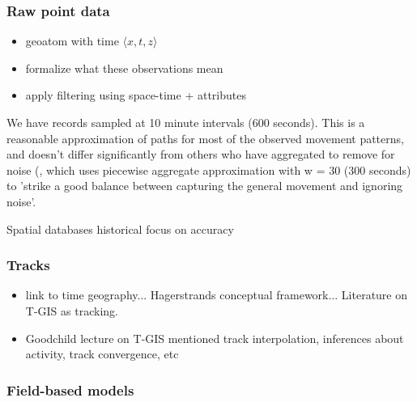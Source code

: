

\subsubsection{Raw point data}
 \begin{itemize}
   \item geoatom with time $\langle x,t,z \rangle$
   \item formalize what these observations mean
   \item apply filtering using space-time + attributes
 \end{itemize}

We have records sampled at 10 minute intervals (600 seconds). This is a reasonable approximation of paths for most of the observed movement patterns, and doesn't differ significantly from others who have aggregated to remove for noise (\cite{Vries2009}, which uses piecewise aggregate approximation with w = 30 (300 seconds) to 'strike a good balance between capturing the general movement and ignoring noise'. %

Spatial databases historical focus on accuracy \citep{goodchild1989accuracy}

\subsubsection{Tracks}
 \begin{itemize}
   \item link to time geography... Hagerstrands conceptual framework... Literature on T-GIS as tracking.
   \item Goodchild lecture on T-GIS mentioned track interpolation, inferences about activity, track convergence, etc

 \end{itemize}

\subsubsection{Field-based models}

